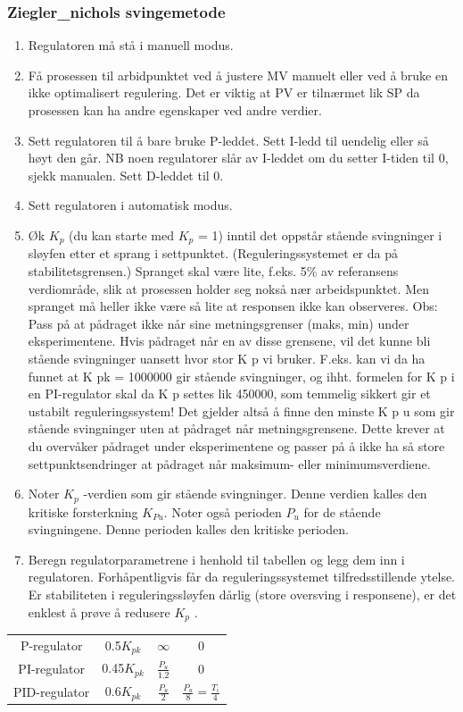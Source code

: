 \subsubsection{Ziegler\_nichols svingemetode}
\begin{enumerate}
\item Regulatoren må stå i manuell modus.
\item Få prosessen til arbidpunktet ved å justere MV manuelt eller ved å bruke en ikke optimalisert regulering. Det er viktig at PV er tilnærmet lik SP da prosessen kan ha andre egenskaper ved andre verdier. 
\item Sett regulatoren til å bare bruke P-leddet. Sett I-ledd til uendelig eller så høyt den går. NB noen regulatorer slår av I-leddet om du setter I-tiden til 0, sjekk  manualen. Sett D-leddet til 0. 
\item Sett regulatoren i automatisk modus.
\item Øk $K_p$ (du kan starte med $K_p$ = 1) inntil det oppstår stående svingninger
i sløyfen etter et sprang i settpunktet. (Reguleringssystemet er da
på stabilitetsgrensen.) Spranget skal være lite, f.eks. 5\% av referansens
verdiområde, slik at prosessen holder seg nokså nær arbeidspunktet.
Men spranget må heller ikke være så lite at responsen ikke kan observeres.
Obs: Pass på at pådraget ikke når sine metningsgrenser (maks, min)
under eksperimentene. Hvis pådraget når en av disse grensene,
vil det kunne bli stående svingninger uansett hvor stor K p vi bruker.
F.eks. kan vi da ha funnet at K pk = 1000000 gir stående svingninger,
og ihht. formelen for K p i en PI-regulator skal da K p settes lik
450000, som temmelig sikkert gir et ustabilt reguleringssystem! Det
gjelder altså å finne den minste K p u som gir stående svingninger
uten at pådraget når metningsgrensene. Dette krever at du overvåker
pådraget under eksperimentene og passer på å ikke ha så store settpunktsendringer
at pådraget når maksimum- eller minimumsverdiene.
\item Noter $K_p$ -verdien som gir stående svingninger. Denne verdien kalles
	den kritiske forsterkning $K_{Pu}$. Noter også perioden $P_u$ for de stående
svingningene. Denne perioden kalles den kritiske perioden.
\item Beregn regulatorparametrene i henhold til tabellen  og legg dem
inn i regulatoren. Forhåpentligvis får da reguleringssystemet tilfredsstillende
ytelse. Er stabiliteten i reguleringssløyfen dårlig (store oversving
i responsene), er det enklest å prøve å redusere $K_p$ .
\end{enumerate}
\begin{tabular}{|c|c|c|c|}
\hline 
 &  &  & \tabularnewline
\hline 
P-regulator & 0.5$K_{pk}$ & $\infty$ & 0\tabularnewline
\hline 
PI-regulator & 0.45$K_{pk}$ & $\frac{P_{u}}{1.2}$ & 0\tabularnewline
\hline 
PID-regulator & 0.6$K_{pk}$ & $\frac{P_{u}}{2}$ & $\frac{P_{u}}{8}=\frac{T_{i}}{4}$\tabularnewline
\hline 
\end{tabular}




